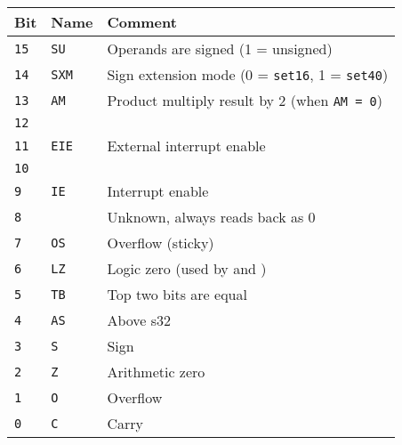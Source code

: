 \documentclass[oneside,english,a4paper,10pt,oneside,openany,final]{memoir}
\newcommand{\Opcode}[1]{\texttt{\nameref{instruction:#1}}}
\begin{document}
\begin{table}[htb]
\centering
\begin{tabular}{|l|l|l|}
\hline
\textbf{Bit} & \textbf{Name} & \textbf{Comment}                                              \\ \hline
\texttt{15}  & \texttt{SU}   & Operands are signed (1 = unsigned)                            \\ \hline
\texttt{14}  & \texttt{SXM}  & Sign extension mode (0 = \texttt{set16}, 1 = \texttt{set40})  \\ \hline
\texttt{13}  & \texttt{AM}   & Product multiply result by 2 (when \texttt{AM = 0})           \\ \hline
\texttt{12}  &               &                                                               \\ \hline
\texttt{11}  & \texttt{EIE}  & External interrupt enable                                     \\ \hline
\texttt{10}  &               &                                                               \\ \hline
\texttt{9}   & \texttt{IE}   & Interrupt enable                                              \\ \hline
\texttt{8}   &               & Unknown, always reads back as 0                               \\ \hline
\texttt{7}   & \texttt{OS}   & Overflow (sticky)                                             \\ \hline
\texttt{6}   & \texttt{LZ}   & Logic zero (used by \Opcode{ANDCF} and \Opcode{ANDF})         \\ \hline
\texttt{5}   & \texttt{TB}   & Top two bits are equal                                        \\ \hline
\texttt{4}   & \texttt{AS}   & Above s32                                                     \\ \hline
\texttt{3}   & \texttt{S}    & Sign                                                          \\ \hline
\texttt{2}   & \texttt{Z}    & Arithmetic zero                                               \\ \hline
\texttt{1}   & \texttt{O}    & Overflow                                                      \\ \hline
\texttt{0}   & \texttt{C}    & Carry                                                         \\ \hline
\end{tabular}
\end{table}
\end{document}
